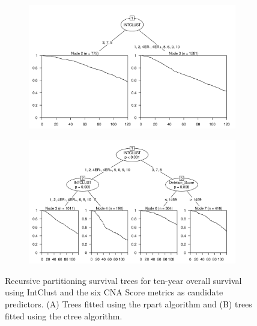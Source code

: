 \begin{figure}[!htb]
\centering

\vspace{0.5cm}

\begin{subfigure}{\textwidth}
\subcaption{}
\includegraphics[width=1\textwidth]{../figures/Appendices/Appendix_B/PartyKit_Survival_Score_TenYearOS_INTCLUST.png}
\end{subfigure}

\vspace{2cm}

\begin{subfigure}{\textwidth}
\subcaption{}
\includegraphics[width=1\textwidth]{../figures/Appendices/Appendix_B/Ctree_Survival_Score_TenYearOS_INTCLUST.png}
\end{subfigure}

\vspace{0.5cm}

\caption[Recursive partitioning survival trees for ten-year overall survival using IntClust and the six CNA Score metrics as candidate predictors.]{Recursive partitioning survival trees for ten-year overall survival using IntClust and the six CNA Score metrics as candidate predictors. (A) Trees fitted using the rpart algorithm and (B) trees fitted using the ctree algorithm.}
\end{figure}

